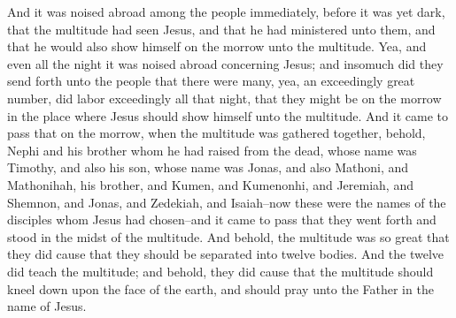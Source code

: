 And it was noised abroad among the people immediately, before it was yet dark, that the multitude had seen Jesus, and that he had ministered unto them, and that he would also show himself on the morrow unto the multitude.
\bverse \iffalse Yea, and even all the night it was noised abroad concerning Jesus; and insomuch did they send forth unto the people that there were many, yea, an exceedingly great number, did labor exceedingly all that night, that they might be on the morrow in the place where Jesus should show himself unto the multitude. \fi
Yea, and even all the night it was noised abroad concerning Jesus; and insomuch did they send forth unto the people that there were many, yea, an exceedingly great number, did labor exceedingly all that night, that they might be on the morrow in the place where Jesus should show himself unto the multitude.
\bverse \iffalse And it came to pass that on the morrow, when the multitude was gathered together, behold, Nephi and his brother whom he had raised from the dead, whose name was Timothy, and also his son, whose name was Jonas, and also Mathoni, and Mathonihah, his brother, and Kumen, and Kumenonhi, and Jeremiah, and Shemnon, and Jonas, and Zedekiah, and Isaiah--now these were the names of the disciples whom Jesus had chosen--and it came to pass that they went forth and stood in the midst of the multitude. \fi
And it came to pass that on the morrow, when the multitude was gathered together, behold, Nephi and his brother whom he had raised from the dead, whose name was Timothy, and also his son, whose name was Jonas, and also Mathoni, and Mathonihah, his brother, and Kumen, and Kumenonhi, and Jeremiah, and Shemnon, and Jonas, and Zedekiah, and Isaiah--now these were the names of the disciples whom Jesus had chosen--and it came to pass that they went forth and stood in the midst of the multitude.
\bverse \iffalse And behold, the multitude was so great that they did cause that they should be separated into twelve bodies. \fi
And behold, the multitude was so great that they did cause that they should be separated into twelve bodies.
\bverse \iffalse And the twelve did teach the multitude; and behold, they did cause that the multitude should kneel down upon the face of the earth, and should pray unto the Father in the name of Jesus. \fi
And the twelve did teach the multitude; and behold, they did cause that the multitude should kneel down upon the face of the earth, and should pray unto the Father in the name of Jesus.
\bverse \iffalse And the disciples did pray unto the Father also in the name of Jesus. And it came to pass that they arose and ministered unto the people. \fi
